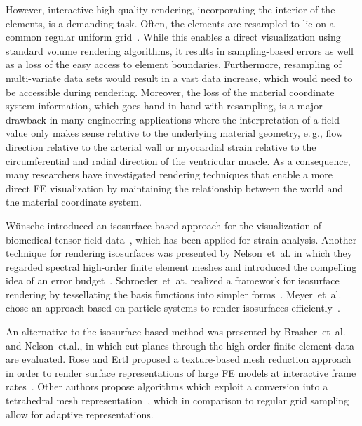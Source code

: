 \documentclass[journal]{vgtc}                %
\begin{document}
However, interactive high-quality rendering, incorporating the interior of the elements, is a demanding task. Often, the elements are resampled to lie on a common regular uniform grid~\cite{Wihelms90}. While this enables a direct visualization using standard volume rendering algorithms, it results in sampling-based errors as well as a loss of the easy access to element boundaries. Furthermore, resampling of multi-variate data sets would result in a vast data increase, which would need to be accessible during rendering. Moreover, the loss of the material coordinate system information, which goes hand in hand with resampling, is a major drawback in many engineering applications where the interpretation of a field value only makes sense relative to the underlying material geometry, e.\,g., flow direction relative to the arterial wall or myocardial strain relative to the circumferential and radial direction of the ventricular muscle. As a consequence, many researchers have investigated rendering techniques that enable a more direct FE visualization by maintaining the relationship between the world and the material coordinate system.

W{\"u}nsche introduced an isosurface-based approach for the visualization of biomedical tensor field data~\cite{wunsche03femvis}, which has been applied for strain analysis. Another technique for rendering isosurfaces was presented by Nelson~et~al. in which they regarded spectral high-order finite element meshes and introduced the compelling idea of an error budget~\cite{nelsonhp06}. Schroeder~et~at. realized a framework for isosurface rendering by tessellating the basis functions into simpler forms~\cite{schroeder06femtess}. Meyer~et~al. chose an approach based on particle systems to render isosurfaces efficiently~\cite{Meyer06}.

An alternative to the isosurface-based method was presented by Brasher~et~al. and Nelson~et.al., in which cut planes through the high-order finite element data are evaluated. Rose and Ertl proposed a texture-based mesh reduction approach in order to render surface representations of large FE models at interactive frame rates~\cite{rose03femvis}. Other authors propose algorithms which exploit a conversion into a tetrahedral mesh representation~\cite{Reed95IncrementalSlicing, marmitt05femtess, Georgii06ageneric}, which in comparison to regular grid sampling allow for adaptive representations.
\end{document}
